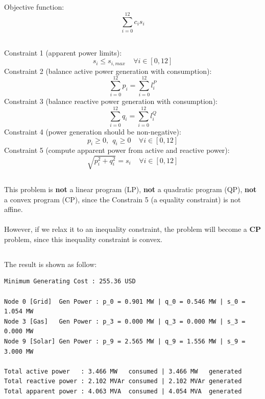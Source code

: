 \documentclass[12pt]{article}
\begin{document}
\subsection{}
Objective function:\\
\begin{equation}
\sum_{i=0}^{12}c_is_i
\end{equation}
\newpage
\subsection{}
Constraint 1 (apparent power limits): 
\begin{equation}
s_i\leq s_{i,max}\ \ \ \ \ \forall i\in [0, 12]
\end{equation}
Constraint 2 (balance active power generation with consumption):
\begin{equation}
\sum_{i=0}^{12}p_i=\sum_{i=0}^{12}l_i^P
\end{equation}
Constraint 3 (balance reactive power generation with consumption):
\begin{equation}
\sum_{i=0}^{12}q_i=\sum_{i=0}^{12}l_i^Q
\end{equation}
Constraint 4 (power generation should be non-negative):
\begin{equation}
p_i\geq 0,\ \ q_i\geq 0 \ \ \ \ \ \forall i\in [0, 12]
\end{equation}
Constraint 5 (compute apparent power from active and reactive power):
\begin{equation}
\sqrt{p_i^2+q_i^2}=s_i \ \ \ \ \ \forall i\in [0, 12]
\end{equation}
\subsection{}
This problem is \textbf{not} a linear program (LP), \textbf{not} a quadratic program (QP), \textbf{not} a convex program (CP), since the Constrain 5 (a equality constraint) is not affine.\\\\
However, if we relax it to an inequality constraint, the problem will become a \textbf{CP} problem, since this inequality constraint is convex.
\newpage
\subsection{}
The result is shown as follow:
\begin{verbatim}
Minimum Generating Cost : 255.36 USD

Node 0 [Grid]  Gen Power : p_0 = 0.901 MW | q_0 = 0.546 MW | s_0 = 1.054 MW
Node 3 [Gas]   Gen Power : p_3 = 0.000 MW | q_3 = 0.000 MW | s_3 = 0.000 MW
Node 9 [Solar] Gen Power : p_9 = 2.565 MW | q_9 = 1.556 MW | s_9 = 3.000 MW

Total active power   : 3.466 MW   consumed | 3.466 MW   generated
Total reactive power : 2.102 MVAr consumed | 2.102 MVAr generated
Total apparent power : 4.063 MVA  consumed | 4.054 MVA  generated
\end{verbatim}
\end{document}

